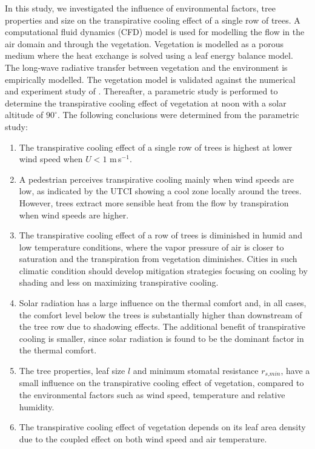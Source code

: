 In this study, we investigated the influence of environmental factors, tree properties and size on the transpirative cooling effect of a single row of trees. A computational fluid dynamics (CFD) model is used for modelling the flow in the air domain and through the vegetation. Vegetation is modelled as a porous medium where the heat exchange is solved using a leaf energy balance model. The long-wave radiative transfer between vegetation and the environment is empirically modelled. The vegetation model is validated against the numerical and experiment study of \cite{Kichah2012}. Thereafter, a parametric study is performed to determine the transpirative cooling effect of vegetation at noon with a solar altitude of $90^{\circ}$. The following conclusions were determined from the parametric study:

\begin{enumerate}
\item The transpirative cooling effect of a single row of trees is highest at lower wind speed when $U<1$ m\,s$^{-1}$. 
\item A pedestrian perceives transpirative cooling mainly when wind speeds are low, as indicated by the UTCI showing a cool zone locally around the trees. However, trees extract more sensible heat from the flow by transpiration when wind speeds are higher.
\item The transpirative cooling effect of a row of trees is diminished in humid and low temperature conditions, where the vapor pressure of air is closer to saturation and the transpiration from vegetation diminishes. Cities in such climatic condition should develop mitigation strategies focusing on cooling by shading and less on maximizing transpirative cooling.
\item Solar radiation has a large influence on the thermal comfort and, in all cases, the comfort level below the trees is substantially higher than downstream of the tree row due to shadowing effects. The additional benefit of transpirative cooling is smaller, since solar radiation is found to be the dominant factor in the thermal comfort.  
\item The tree properties, leaf size $l$ and minimum stomatal resistance $r_{\textit{s,min}}$, have a small influence on the transpirative cooling effect of vegetation, compared to the environmental factors such as wind speed, temperature and relative humidity.
\item The transpirative cooling effect of vegetation depends on its leaf area density due to the coupled effect on both wind speed and air temperature. 

\end{enumerate}
